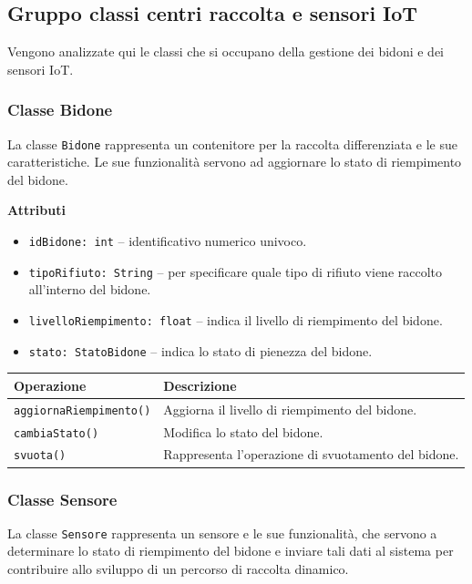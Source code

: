 \documentclass[12pt,a4paper]{article}
\begin{document}
\subsection{Gruppo classi centri raccolta e sensori IoT} 
Vengono analizzate qui le classi che si occupano della gestione dei bidoni e dei sensori IoT.

\subsubsection{Classe Bidone}
La classe \texttt{Bidone} rappresenta un contenitore per la raccolta differenziata e le sue caratteristiche.
Le sue funzionalità servono ad aggiornare lo stato di riempimento del bidone.

\textbf{Attributi}
\begin{itemize}
    \item \texttt{idBidone: int} -- identificativo numerico univoco.
    \item \texttt{tipoRifiuto: String} -- per specificare quale tipo di rifiuto viene raccolto all'interno del bidone.
    \item \texttt{livelloRiempimento: float} -- indica il livello di riempimento del bidone.
    \item \texttt{stato: StatoBidone} -- indica lo stato di pienezza del bidone.
\end{itemize}

\begin{table}[H]
\centering
\begin{tabularx}{\textwidth}{@{}lX@{}}
\toprule
\textbf{Operazione} & \textbf{Descrizione} \\ \midrule
\texttt{aggiornaRiempimento()} & Aggiorna il livello di riempimento del bidone. \\
\texttt{cambiaStato()} & Modifica lo stato del bidone. \\
\texttt{svuota()} & Rappresenta l'operazione di svuotamento del bidone. \\
\end{tabularx}
\end{table}

\subsubsection{Classe Sensore}
La classe \texttt{Sensore} rappresenta un sensore e le sue funzionalità,
che servono a determinare lo stato di riempimento del bidone e inviare tali dati al sistema 
per contribuire allo sviluppo di un percorso di raccolta dinamico.
\end{document}
